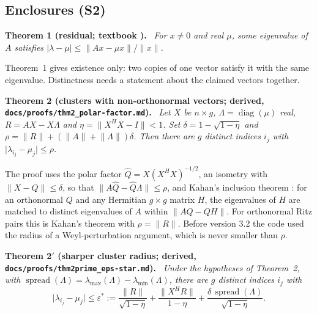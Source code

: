 \documentclass[11pt,a4paper]{article}
\newcommand{\code}[1]{\texttt{#1}}
\newcommand{\norm}[1]{\lVert #1\rVert}
\newcommand{\abs}[1]{\lvert #1\rvert}
\newenvironment{result}[1]{\par\medskip\noindent\textbf{#1.}\ \itshape}{\par\medskip}
\begin{document}
\subsection{Enclosures (S2)}

\begin{result}{Theorem 1 (residual; textbook \cite{Parlett1998})}
For $x\neq0$ and real $\mu$, some eigenvalue of $A$ satisfies $\abs{\lambda-\mu}\le\norm{Ax-\mu x}/\norm{x}$.
\end{result}

Theorem~1 gives existence only: two copies of one vector satisfy it with the same eigenvalue. Distinctness needs a
statement about the claimed vectors together.

\begin{result}{Theorem 2 (clusters with non-orthonormal vectors; derived,
\code{docs/\allowbreak proofs/\allowbreak thm2\_polar-factor.md})}
Let $X$ be $n\times g$, $\Lambda=\operatorname{diag}(\mu)$ real, $R=AX-X\Lambda$ and $\eta=\norm{X^HX-I}<1$. Set
$\delta=1-\sqrt{1-\eta}$ and $\rho=\norm{R}+(\norm{A}+\norm{\Lambda})\delta$. Then there are $g$ distinct indices $i_j$
with $\abs{\lambda_{i_j}-\mu_j}\le\rho$.
\end{result}

The proof uses the polar factor $\hat Q=X(X^HX)^{-1/2}$, an isometry with $\norm{X-\hat Q}\le\delta$, so that
$\norm{A\hat Q-\hat Q\Lambda}\le\rho$, and Kahan's inclusion theorem \cite{Kahan1967}: for an orthonormal $Q$ and any
Hermitian $g\times g$ matrix $H$, the eigenvalues of $H$ are matched to distinct eigenvalues of $A$ within
$\norm{AQ-QH}$. For orthonormal Ritz pairs this is Kahan's theorem with $\rho=\norm{R}$. Before version 3.2 the code
used the radius of a Weyl-perturbation argument, which is never smaller than $\rho$.

\begin{result}{Theorem 2$'$ (sharper cluster radius; derived, \code{docs/proofs/thm2prime\_eps-star.md})}
Under the hypotheses of Theorem~2, with $\operatorname{spread}(\Lambda)=\lambda_{\max}(\Lambda)-\lambda_{\min}(\Lambda)$,
there are $g$ distinct indices $i_j$ with
\begin{equation}
\abs{\lambda_{i_j}-\mu_j}\le\varepsilon^*:=\frac{\norm{R}}{\sqrt{1-\eta}}+\frac{\norm{X^HR}}{1-\eta}
+\frac{\delta\,\operatorname{spread}(\Lambda)}{\sqrt{1-\eta}}.
\label{eq:epsstar}
\end{equation}
\end{result}
\end{document}
